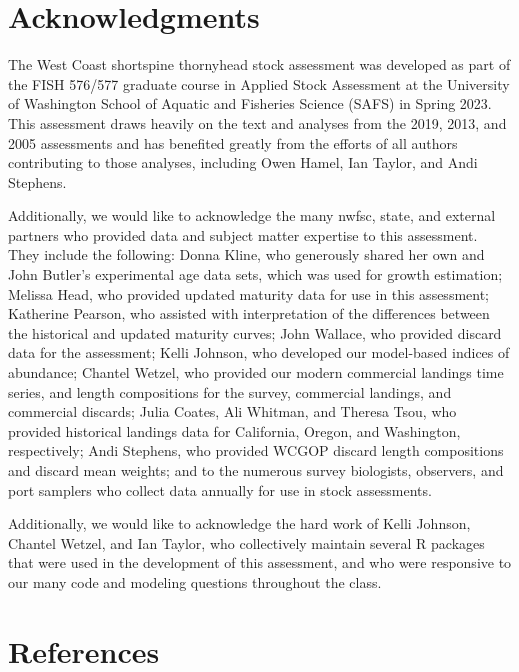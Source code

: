 \documentclass[11pt,
  letterpaper,
]{article}
\begin{document}
\hypertarget{acknowledgments}{%
\section{Acknowledgments}\label{acknowledgments}}

The West Coast shortspine thornyhead stock assessment was developed as part of the FISH 576/577 graduate course in Applied Stock Assessment at the University of Washington School of Aquatic and Fisheries Science (SAFS) in Spring 2023. This assessment draws heavily on the text and analyses from the 2019, 2013, and 2005 assessments and has benefited greatly from the efforts of all authors contributing to those analyses, including Owen Hamel, Ian Taylor, and Andi Stephens.

Additionally, we would like to acknowledge the many \gls{nwfsc}, state, and external partners who provided data and subject matter expertise to this assessment. They include the following: Donna Kline, who generously shared her own and John Butler's experimental age data sets, which was used for growth estimation; Melissa Head, who provided updated maturity data for use in this assessment; Katherine Pearson, who assisted with interpretation of the differences between the historical and updated maturity curves; John Wallace, who provided discard data for the assessment; Kelli Johnson, who developed our model-based indices of abundance; Chantel Wetzel, who provided our modern commercial landings time series, and length compositions for the survey, commercial landings, and commercial discards; Julia Coates, Ali Whitman, and Theresa Tsou, who provided historical landings data for California, Oregon, and Washington, respectively; Andi Stephens, who provided WCGOP discard length compositions and discard mean weights; and to the numerous survey biologists, observers, and port samplers who collect data annually for use in stock assessments.

Additionally, we would like to acknowledge the hard work of Kelli Johnson, Chantel Wetzel, and Ian Taylor, who collectively maintain several R packages that were used in the development of this assessment, and who were responsive to our many code and modeling questions throughout the class.

\clearpage

\hypertarget{references}{%
\section{References}\label{references}}
\end{document}
